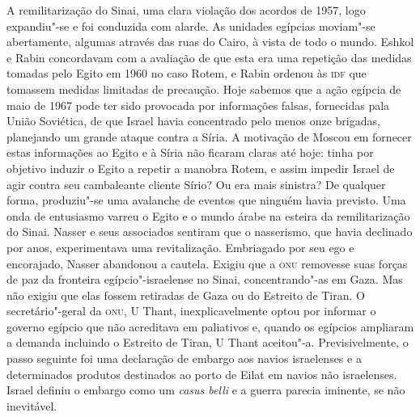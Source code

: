 A remilitarização do Sinai, uma clara violação dos acordos de 1957, logo
expandiu"-se e foi conduzida com alarde. As unidades egípcias moviam"-se
abertamente, algumas através das ruas do Cairo, à vista de todo o mundo.
Eshkol e Rabin concordavam com a avaliação de que esta era uma repetição
das medidas tomadas pelo Egito em 1960 no caso Rotem, e Rabin ordenou às
\textsc{idf} que tomassem medidas limitadas de precaução. Hoje sabemos que a ação
egípcia de maio de 1967 pode ter sido provocada por informações falsas,
fornecidas pala União Soviética, de que Israel havia concentrado pelo
menos onze brigadas, planejando um grande ataque contra a Síria. A
motivação de Moscou em fornecer estas informações ao Egito e à Síria não
ficaram claras até hoje: tinha por objetivo induzir o Egito a repetir a
manobra Rotem, e assim impedir Israel de agir contra seu cambaleante
cliente Sírio? Ou era mais sinistra? De qualquer forma, produziu"-se uma
avalanche de eventos que ninguém havia previsto. Uma onda de entusiasmo
varreu o Egito e o mundo árabe na esteira da remilitarização do Sinai.
Nasser e seus associados sentiram que o nasserismo, que havia declinado
por anos, experimentava uma revitalização. Embriagado por seu ego e
encorajado, Nasser abandonou a cautela. Exigiu que a \textsc{onu} removesse suas
forças de paz da fronteira egípcio"-israelense no Sinai, concentrando"-as
em Gaza. Mas não exigiu que elas fossem retiradas de Gaza ou do
Estreito de Tiran. O secretário"-geral da \textsc{onu}, U Thant,
inexplicavelmente optou por informar o governo egípcio que não
acreditava em paliativos e, quando os egípcios ampliaram a demanda
incluindo o Estreito de Tiran, U Thant aceitou"-a. Previsivelmente, o
passo seguinte foi uma declaração de embargo aos navios israelenses e a
determinados produtos destinados ao porto de Eilat em navios
não israelenses. Israel definiu o embargo como um \textit{casus belli}
e a guerra parecia iminente, se não inevitável.

